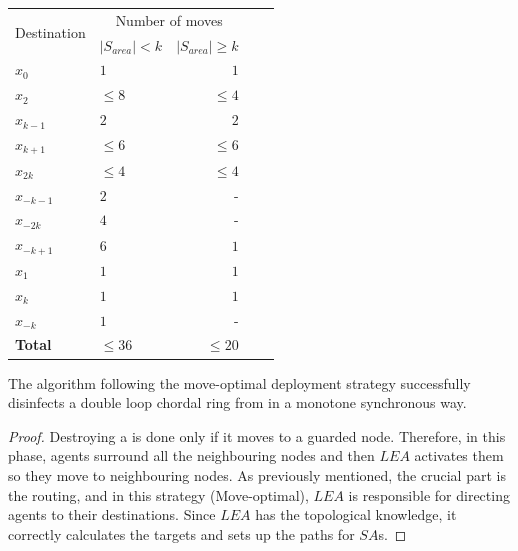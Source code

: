 \begin{center}
\begin{tabular}{|l|lr|lr|}\hline
\multirow{2}{1 in}{Destination} &
\multicolumn{2}{c|}{Number of moves}
\\
& $\left\vert{S_{area}}\right\vert < k$ & $\left\vert{S_{area}}\right\vert \ge k$ \\\hline\hline
$x_0$       & $1$ & $1$  \\\hline
$x_2$       & $\leq8$ & $\leq 4$  \\\hline
$x_{k-1}$    & $2$   & $2$     \\\hline
$x_{k+1}$ & $\leq 6$   & $\leq 6$         \\\hline
$x_{2k}$            & $\leq 4$   & $\leq 4$        \\\hline

$x_{-k-1}$    & $2$   & -     \\\hline
$x_{-2k}$ & $4$   & -        \\\hline
$x_{-k+1}$            & $6$   & $1$        \\\hline
$x_1$       & $1$ & $1$  \\\hline
$x_k$       & $1$ & $1$  \\\hline
$x_{-k}$       & $1$ & -  \\\hline
{\bf Total}     & $\leq 36$   & $\leq 20$ \\\hline
\end{tabular}
\end{center}



\begin{theorem}\label{correctnes_mo}
The  algorithm  following  the move-optimal deployment strategy successfully disinfects a double loop chordal ring from \bvs in a monotone synchronous way.
\end{theorem}
\begin{proof}
Destroying a \bv is done only if it moves to a guarded node. Therefore, in this phase, agents surround all the neighbouring nodes  and then $LEA$ activates them so they move to neighbouring nodes. As previously mentioned, the crucial part is the routing, and in this strategy (Move-optimal), $LEA$ is responsible for directing agents to their destinations. Since $LEA$ has the topological knowledge, it correctly calculates the targets and sets up the paths for $SA$s.
\end{proof}
